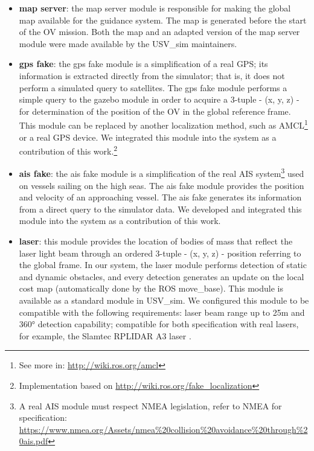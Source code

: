     \begin{itemize}
    
        \item \textbf{map server}: the map server module is responsible for making the global map available for the guidance system. The map is generated before the start of the \ac{OV} mission. Both the map and an adapted version of the map server module were made available by the USV\_sim maintainers.
    
        \item \textbf{gps fake}: the gps fake module is a simplification of a real GPS; its information is extracted directly from the simulator; that is, it does not perform a simulated query to satellites. The gps fake module performs a simple query to the gazebo module in order to acquire a 3-tuple - (x, y, z) - for determination of the position of the \ac{OV} in the global reference frame. This module can be replaced by another localization method, such as \ac{AMCL}\footnote{See more in: \url{http://wiki.ros.org/amcl}} or a real GPS device. We integrated this module into the system as a contribution of this work.\footnote{Implementation based on \url{http://wiki.ros.org/fake_localization}}
    
        \item \textbf{ais fake}: the ais fake module is a simplification of the real AIS system\footnote{A real AIS module must respect NMEA legislation, refer to NMEA for specification: \url{https://www.nmea.org/Assets/nmea\%20collision\%20avoidance\%20through\%20ais.pdf}} used on vessels sailing on the high seas. The ais fake module provides the position and velocity of an approaching vessel. The ais fake generates its information from a direct query to the simulator data. We developed and integrated this module into the system as a contribution of this work.
    
        \item \textbf{laser}: this module provides the location of bodies of mass that reflect the laser light beam through an ordered 3-tuple - (x, y, z) - position referring to the global frame. In our system, the laser module performs detection of static and dynamic obstacles, and every detection generates an update on the local cost map (automatically done by the \ac{ROS} move\_base). This module is available as a standard module in USV\_sim. We configured this module to be compatible with the following requirements: laser beam range up to 25m and 360° detection capability; compatible for both specification with real lasers, for example, the Slamtec RPLIDAR A3 laser \cite{RPLidarA3}.
    
    \end{itemize}
    
